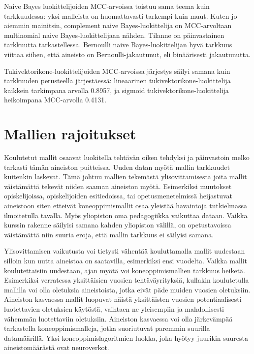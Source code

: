\documentclass[finnish,twoside,openright]{HYgraduMLDS}
\begin{document}
Naive Bayes luokittelijoiden MCC-arvoissa toistuu sama teema kuin tarkkuudessa: yksi malleista on huomattavasti tarkempi kuin muut. Kuten jo aiemmin mainitsin, complement naive Bayes-luokittelija on MCC-arvoltaan multinomial naive Bayes-luokittelijaan nähden. Tilanne on päinvastainen tarkkuutta tarkastellessa. Bernoulli naive Bayes-luokittelijan hyvä tarkkuus viittaa siihen, että aineisto on Bernoulli-jakautunut, eli binäärisesti jakautunutta.

Tukivektorikone-luokittelijoiden MCC-arvoissa järjestys säilyi samana kuin tarkkuuden perusteella järjestäessä: lineaarinen tukivektorikone-luokittelija kaikkein tarkimpana arvolla 0.8957, ja sigmoid tukivektorikone-luokittelija heikoimpana MCC-arvolla 0.4131.


\section{Mallien rajoitukset}

Koulutetut mallit osaavat luokitella tehtävän oiken tehdyksi ja päinvastoin melko tarkasti tämän aineiston puitteissa. Uuden datan myötä mallin tarkkuudet kuitenkin laskevat. Tämä johtuu mallien tekemästä ylisovittamisesta joita mallit väistämättä tekevät niiden saaman aineiston myötä. Esimerkiksi muutokset opiskelijoissa, opiskelijoiden esitiedoissa, tai opetusmenetelmissä heijastuvat aineistoon siten etteivät koneoppimismallit osaa yleistää havaintoja tutkielmassa ilmoitetulla tavalla. Myös yliopiston oma pedagogiikka vaikuttaa dataan. Vaikka kurssin rakenne säilyisi samana kahden yliopiston välillä, on opetustavoissa väistämättä niin suuria eroja, että mallin tarkkuus ei säilyisi samana.

Ylisovittamisen vaikutusta voi tietysti vähentää kouluttamalla mallit uudestaan silloin kun uutta aineistoa on saatavilla, esimerkiksi ensi vuodelta. Vaikka mallit koulutettaisiin uudestaan, ajan myötä voi koneoppimismallien tarkkuus heiketä. Esimerkiksi verratessa yksittäisien vuosien tehtäväyrityksiä, kullakin koulutetulla mallilla voi olla oletuksia aineistoista, jotka eivät päde muiden vuosien oletuksiin. Aineiston kasvaessa mallit luopuvat näistä yksittäisten vuosien potentiaalisesti luotettavien oletuksien käytöstä, vaihtaen ne yleisempiin ja mahdollisesti vähemmän luotettaviin oletuksiin. Aineiston kasvaessa voi olla järkevämpää tarkastella koneoppimismalleja, jotka suoriutuvat paremmin suurilla datamäärillä. Yksi koneoppimislagoritmien luokka, joka hyötyy juurikin suuresta aineistomäärästä ovat neuroverkot.
\end{document}
